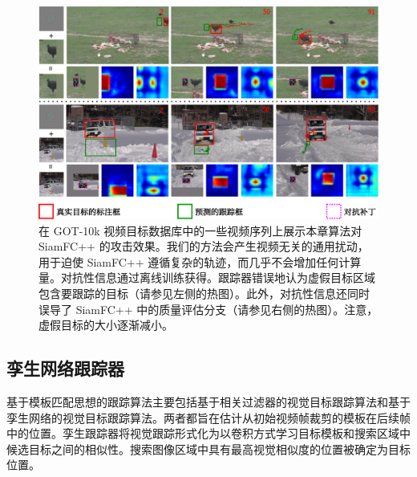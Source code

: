\begin{figure}[t]
\centering
\includegraphics[width=1.0\textwidth]{Img/attack/1_v8.pdf}
\caption{在 GOT-10k 视频目标数据库中的一些视频序列上展示本章算法对 SiamFC++ 的攻击效果。我们的方法会产生视频无关的通用扰动，用于迫使 SiamFC++ 遵循复杂的轨迹，而几乎不会增加任何计算量。对抗性信息通过离线训练获得。跟踪器错误地认为虚假目标区域包含要跟踪的目标（请参见左侧的热图）。此外，对抗性信息还同时误导了 SiamFC++ 中的质量评估分支（请参见右侧的热图）。注意，虚假目标的大小逐渐减小。} 
\label{fig:1}
\end{figure}

\subsection{孪生网络跟踪器}

基于模板匹配思想的跟踪算法主要包括基于相关过滤器的视觉目标跟踪算法和基于孪生网络的视觉目标跟踪算法。两者都旨在估计从初始视频帧裁剪的模板在后续帧中的位置。孪生跟踪器将视觉跟踪形式化为以卷积方式学习目标模板和搜索区域中候选目标之间的相似性。搜索图像区域中具有最高视觉相似度的位置被确定为目标位置。

